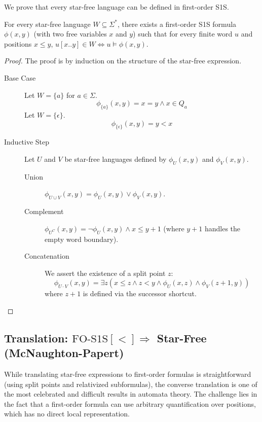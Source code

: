 We prove that every star-free language can be defined in first-order S1S.

\begin{theorem}
For every star-free language $W \subseteq \Sigma^*$, there exists a first-order S1S formula $\phi(x, y)$ (with two free variables $x$ and $y$) such that for every finite word $u$ and positions $x \le y$, $u[x..y] \in W \iff u \models \phi(x, y)$.
\end{theorem}

\begin{proof}
The proof is by induction on the structure of the star-free expression.
\begin{description}
    \item[Base Case] Let $W = \{a\}$ for $a \in \Sigma$.
    $$\phi_{\{a\}}(x, y) = x = y \land x \in Q_a$$
    Let $W = \{\epsilon\}$.
    $$\phi_{\{\epsilon\}}(x, y) = y < x$$
    
    \item[Inductive Step] Let $U$ and $V$ be star-free languages defined by $\phi_U(x, y)$ and $\phi_V(x, y)$.
    \begin{description}
        \item[Union] $\phi_{U \cup V}(x, y) = \phi_U(x, y) \lor \phi_V(x, y)$.
        \item[Complement] $\phi_{U^C}(x, y) = \neg \phi_U(x, y) \land x \le y + 1$ (where $y+1$ handles the empty word boundary).
        \item[Concatenation] We assert the existence of a split point $z$:
    $$\phi_{U \cdot V}(x, y) = \exists z \left( x \le z \land z < y \land \phi_U(x, z) \land \phi_V(z+1, y) \right)$$
    where $z+1$ is defined via the successor shortcut.
    \end{description}
\end{description}
\end{proof}

\subsection{Translation: $\text{FO-S1S}[<] \Longrightarrow$ Star-Free (McNaughton-Papert)}
\label{subsec:fo-to-star-free}

While translating star-free expressions to first-order formulas is straightforward (using split points and relativized subformulas), the converse translation is one of the most celebrated and difficult results in automata theory. The challenge lies in the fact that a first-order formula can use arbitrary quantification over positions, which has no direct local representation.

